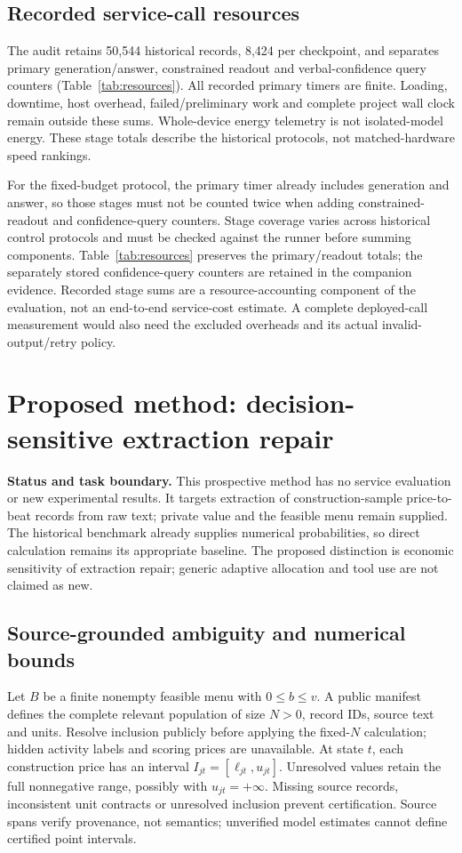 \documentclass[sigconf,anonymous,nonacm]{acmart}
\begin{document}
\subsection{Recorded service-call resources}\label{sec:callresources}
The audit retains 50,544 historical records, 8,424 per checkpoint, and separates primary generation/answer, constrained readout and verbal-confidence query counters (Table~\ref{tab:resources}). All recorded primary timers are finite. Loading, downtime, host overhead, failed/preliminary work and complete project wall clock remain outside these sums. Whole-device energy telemetry is not isolated-model energy. These stage totals describe the historical protocols, not matched-hardware speed rankings.

For the fixed-budget protocol, the primary timer already includes generation and answer, so those stages must not be counted twice when adding constrained-readout and confidence-query counters. Stage coverage varies across historical control protocols and must be checked against the runner before summing components. Table~\ref{tab:resources} preserves the primary/readout totals; the separately stored confidence-query counters are retained in the companion evidence. Recorded stage sums are a resource-accounting component of the evaluation, not an end-to-end service-cost estimate. A complete deployed-call measurement would also need the excluded overheads and its actual invalid-output/retry policy.

\FloatBarrier
\section{Proposed method: decision-sensitive extraction repair}\label{sec:selectiverepair}
\textbf{Status and task boundary.} This prospective method has no service evaluation or new experimental results. It targets extraction of construction-sample price-to-beat records from raw text; private value and the feasible menu remain supplied. The historical benchmark already supplies numerical probabilities, so direct calculation remains its appropriate baseline. The proposed distinction is economic sensitivity of extraction repair; generic adaptive allocation and tool use are not claimed as new.

\subsection{Source-grounded ambiguity and numerical bounds}
Let $B$ be a finite nonempty feasible menu with $0\leq b\leq v$. A public manifest defines the complete relevant population of size $N>0$, record IDs, source text and units. Resolve inclusion publicly before applying the fixed-$N$ calculation; hidden activity labels and scoring prices are unavailable. At state $t$, each construction price has an interval $I_{jt}=[\ell_{jt},u_{jt}]$. Unresolved values retain the full nonnegative range, possibly with $u_{jt}=+\infty$. Missing source records, inconsistent unit contracts or unresolved inclusion prevent certification. Source spans verify provenance, not semantics; unverified model estimates cannot define certified point intervals.
\end{document}
